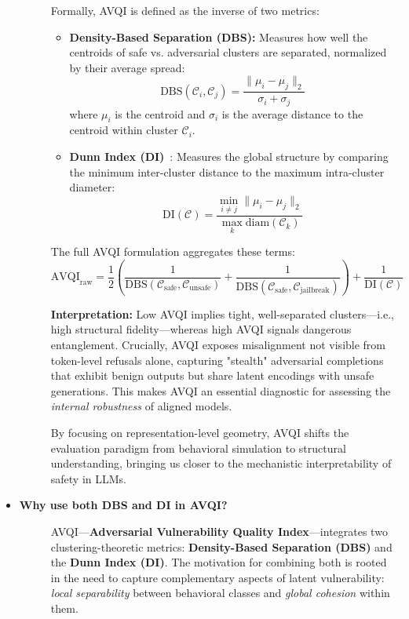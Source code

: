 \begin{itemize}[leftmargin=15pt,nolistsep]
\begin{description}
Formally, AVQI is defined as the inverse of two metrics:

\begin{itemize}[leftmargin=1.2em, itemsep=0pt]
    \item \textbf{Density-Based Separation (DBS):} Measures how well the centroids of safe vs. adversarial clusters are separated, normalized by their average spread:
    \[
    \mathrm{DBS}(\mathcal{C}_i, \mathcal{C}_j) = \frac{\|\mu_i - \mu_j\|_2}{\sigma_i + \sigma_j}
    \]
    where $\mu_i$ is the centroid and $\sigma_i$ is the average distance to the centroid within cluster $\mathcal{C}_i$.
    
    \item \textbf{Dunn Index (DI)}~\citep{dunn1973fuzzy}: Measures the global structure by comparing the minimum inter-cluster distance to the maximum intra-cluster diameter:
    \[
    \mathrm{DI}(\mathcal{C}) = \frac{\min_{i \ne j} \|\mu_i - \mu_j\|_2}{\max_k \mathrm{diam}(\mathcal{C}_k)}
    \]
\end{itemize}

The full AVQI formulation aggregates these terms:
\[
\mathrm{AVQI}_{\text{raw}} = \frac{1}{2} \left( 
\frac{1}{\mathrm{DBS}(\mathcal{C}_{\text{safe}}, \mathcal{C}_{\text{unsafe}})} +
\frac{1}{\mathrm{DBS}(\mathcal{C}_{\text{safe}}, \mathcal{C}_{\text{jailbreak}})}
\right)
+ \frac{1}{\mathrm{DI}(\mathcal{C})}
\]

\textbf{Interpretation:} Low AVQI implies tight, well-separated clusters—i.e., high structural fidelity—whereas high AVQI signals dangerous entanglement. Crucially, AVQI exposes misalignment not visible from token-level refusals alone, capturing "stealth" adversarial completions that exhibit benign outputs but share latent encodings with unsafe generations. This makes AVQI an essential diagnostic for assessing the \emph{internal robustness} of aligned models.

By focusing on representation-level geometry, AVQI shifts the evaluation paradigm from behavioral simulation to structural understanding, bringing us closer to the mechanistic interpretability of safety in LLMs.
\end{description}


\item[\ding{93}] { \selectfont \textbf{Why use both DBS and DI in AVQI?}}
\begin{description}
\item[]
AVQI—\textbf{Adversarial Vulnerability Quality Index}—integrates two clustering-theoretic metrics: \textbf{Density-Based Separation (DBS)} and the \textbf{Dunn Index (DI)}. The motivation for combining both is rooted in the need to capture complementary aspects of latent vulnerability: \emph{local separability} between behavioral classes and \emph{global cohesion} within them.


\end{description}
\end{itemize}
